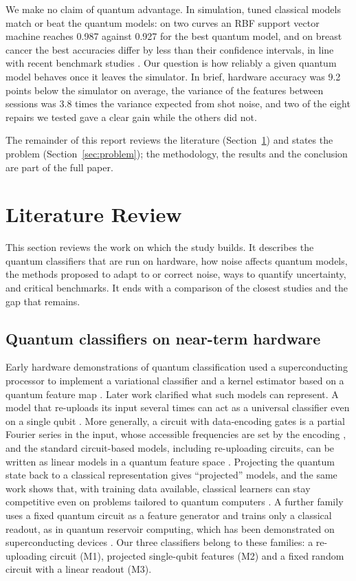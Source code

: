 \documentclass[10pt,conference]{IEEEtran}
\begin{document}
We make no claim of quantum advantage. In simulation, tuned classical models match or beat the
quantum models: on two curves an RBF support vector machine reaches
0.987 against 0.927 for the best quantum model,
and on breast cancer the best accuracies differ by less than their confidence
intervals, in line with recent benchmark studies
\cite{bowles2024benchmarking,schuld2022advantage}. Our question is how reliably a given quantum
model behaves once it leaves the simulator. In brief, hardware accuracy was 9.2
points below the simulator on average,
the variance of the features between sessions was 3.8 times the variance expected from
shot noise,
and two of the eight repairs we tested gave a clear gain while the others did not.

The remainder of this report reviews the literature
(Section~\ref{sec:litreview}) and states the problem (Section~\ref{sec:problem}); the
methodology, the results and the conclusion are part of the full paper.

\section{Literature Review}
\label{sec:litreview}

This section reviews the work on which the study builds. It describes the quantum classifiers
that are run on hardware, how noise affects quantum models, the methods proposed to adapt to
or correct noise, ways to quantify uncertainty, and critical benchmarks. It ends with a
comparison of the closest studies and the gap that remains.

\subsection{Quantum classifiers on near-term hardware}
Early hardware demonstrations of quantum classification used a superconducting processor to
implement a variational classifier and a kernel estimator based on a quantum feature map
\cite{havlicek2019supervised}. Later work clarified what such models can represent. A model
that re-uploads its input several times can act as a universal classifier even on a single
qubit \cite{perezsalinas2020reuploading}. More generally, a circuit with data-encoding gates is
a partial Fourier series in the input, whose accessible frequencies are set by the encoding
\cite{schuld2021encoding}, and the standard circuit-based models, including re-uploading
circuits, can be written as linear models in a quantum feature space
\cite{jerbi2023beyondkernels}. Projecting the quantum state back to a classical representation
gives ``projected'' models, and the same work shows that, with training data available,
classical learners can stay competitive even on problems tailored to quantum computers
\cite{huang2021power}. A further family uses a fixed quantum circuit as a feature generator and
trains only a classical readout, as in quantum reservoir computing, which has been
demonstrated on superconducting devices \cite{yasuda2023qrc}. Our three classifiers belong to
these families: a re-uploading circuit (M1), projected single-qubit features (M2) and a fixed
random circuit with a linear readout (M3).
\end{document}
